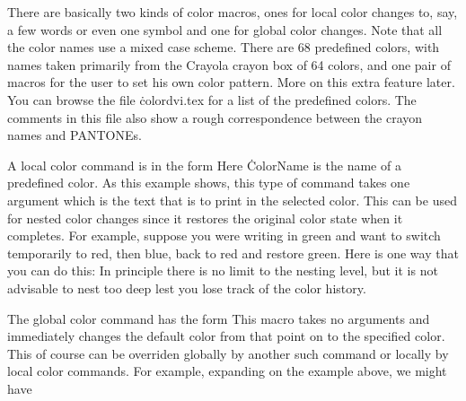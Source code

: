 There are basically two kinds of color macros, ones for local color
changes to, say, a few words or even one symbol and one for global
color changes.	Note that all the color names use a mixed case scheme.
There are 68 predefined colors, with names taken primarily from the
Crayola crayon box of 64 colors, and one pair of macros for the user
to set his own color pattern.  More on this extra feature later. You
can browse the file \.{colordvi.tex} for a list of the predefined colors.
The comments in this file also show a rough correspondence between the
crayon names and PANTONEs.

A local color command is in the form
\noindent
Here \.{ColorName} is the name of a predefined color. As this example
shows, this type of command takes one argument which is the text that
is to print in the selected color.  This can be used for nested color
changes since it restores the original color state when it completes.
For example, suppose you were writing in green and want to switch
temporarily to red, then blue, back to red and restore green.  Here is
one way that you can do this:
\noindent
In principle there is no limit to the nesting level, but it is not
advisable to nest too deep lest you lose track of the color history.

The global color command has the form
\noindent
This macro takes no arguments and immediately changes the default
color from that point on to the specified color. This of course can be
overriden globally by another such command or locally by local color
commands. For example, expanding on the example above, we might have


